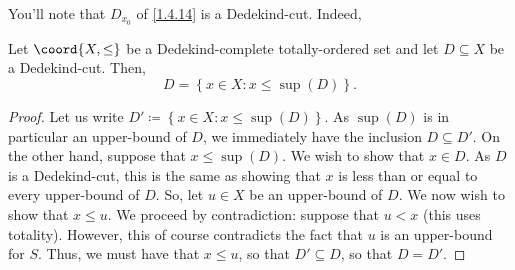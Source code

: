 You'll note that $D_{x_0}$ of \eqref{1.4.14} is a Dedekind-cut.  Indeed,
\begin{prp}{}{}
Let $\coord{X,\leq}$ be a Dedekind-complete totally-ordered set and let $D\subseteq X$ be a Dedekind-cut.  Then,
\begin{equation}
D=\left\{ x\in X:x\leq \sup (D)\right\} .
\end{equation}
\begin{proof}
Let us write $D'\coloneqq \left\{ x\in X:x\leq \sup (D)\right\}$.  As $\sup (D)$ is in particular an upper-bound of $D$, we immediately have the inclusion $D\subseteq D'$.  On the other hand, suppose that $x\leq \sup (D)$.  We wish to show that $x\in D$.  As $D$ is a Dedekind-cut, this is the same as showing that $x$ is less than or equal to every upper-bound of $D$.  So, let $u\in X$ be an upper-bound of $D$.  We now wish to show that $x\leq u$.  We proceed by contradiction:  suppose that $u<x$ (this uses totality).  However, this of course contradicts the fact that $u$ is an upper-bound for $S$.  Thus, we must have that $x\leq u$, so that $D'\subseteq D$, so that $D=D'$.
\end{proof}
\end{prp}



